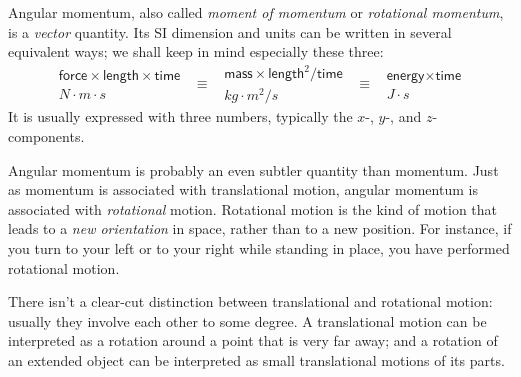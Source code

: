 \documentclass[a4paper,12pt,%
onecolumn,oneside,titlepage,%
british%
]{memoir}
\renewcommand*{\|}[1][]{\nonscript\:#1\vert\nonscript\:\mathopen{}}
\begin{document}
Angular momentum, also called \emph{moment of momentum} or \emph{rotational momentum}, is a \emph{vector} quantity. Its SI dimension and units can be written in several equivalent ways; we shall keep in mind especially these three:
\begin{equation*}
  \begin{gathered}
    \textsf{force}\times\textsf{length}\times\textsf{time}
    \\\unit{N\cdot m\cdot s}
  \end{gathered}
\enspace  \equiv\enspace
  \begin{gathered}
  \textsf{mass}\times\textsf{length}^{2}/\textsf{time}
    \\\unit{kg\cdot m^{2}/s}
  \end{gathered}
\enspace  \equiv\enspace
  \begin{gathered}
  \textsf{energy}\times\textsf{time}
    \\\unit{J\cdot s}
  \end{gathered}
\end{equation*}
It is usually expressed with three numbers, typically the $x$-, $y$-, and $z$-components.

Angular momentum is probably an even subtler quantity than momentum. Just as momentum is associated with translational motion, angular momentum is associated with \emph{rotational} motion. Rotational motion is the kind of motion that leads to a \emph{new orientation} in space, rather than to a new position. For instance, if you turn to your left or to your right while standing in place, you have performed rotational motion.

There isn't a clear-cut distinction between translational and rotational motion: usually they involve each other to some degree. A translational motion can be interpreted as a rotation around a point that is very far away; and a rotation of an extended object can be interpreted as small translational motions of its parts.
\end{document}
